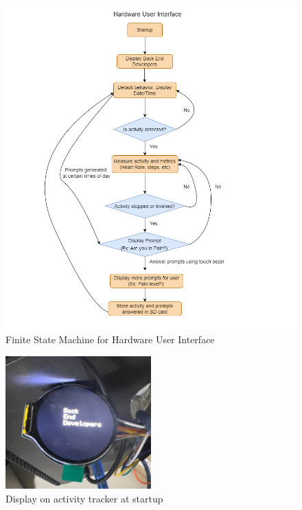 \documentclass[12pt, titlepage]{article}
\begin{document}
\begin{figure}[H]
	\begin{center}
		 \includegraphics[width=1\textwidth]{HardwareUI_FSM}
		\caption{Finite State Machine for Hardware User Interface}
		\label{HardwareUI_FSM} 
	\end{center}
\end{figure}

\begin{figure}[H]
	\begin{center}
		 \includegraphics[width=0.5\textwidth]{BEDDisplay}
		\caption{Display on activity tracker at startup}
		\label{BEDDisplay} 
	\end{center}
\end{figure}
\end{document}
